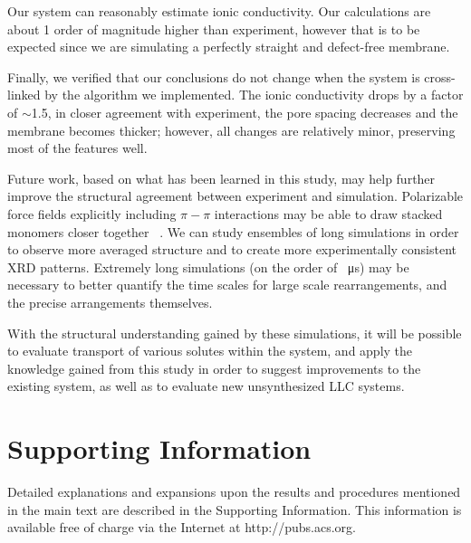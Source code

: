 \documentclass[journal=jpcbfk,manuscript=article]{achemso}
\begin{document}

  Our system can reasonably estimate ionic conductivity. Our
  calculations are about 1 order of magnitude higher than experiment, however
  that is to be expected since we are simulating a perfectly straight and
  defect-free membrane. 

  Finally, we verified that our conclusions do not change when the system is
  cross-linked by the algorithm we implemented. The ionic conductivity drops by a factor
  of $\sim$1.5, in closer agreement with experiment, the pore spacing decreases and
  the membrane becomes thicker; however, all changes are relatively minor, 
  preserving most of the features well.

  Future work, based on what has been learned in this study, may help further
  improve the structural agreement between experiment and simulation. 
  Polarizable force fields explicitly including $\pi-\pi$ interactions may be
  able to draw stacked monomers closer together 
  ~\cite{shi_polarizable_2013,kaminski_development_2004,lopes_polarizable_2007}. 
  We can study ensembles of long simulations in order
  to observe more averaged structure and to create more experimentally consistent
  XRD patterns. Extremely long simulations (on the order of \SI{}{\micro s}) may
  be necessary to better quantify the time scales for large scale rearrangements,
  and the precise arrangements themselves.

  With the structural understanding gained by these simulations, it will be
  possible to evaluate transport of various solutes within the system, and apply the
  knowledge gained from this study in order to suggest improvements to the
  existing system, as well as to evaluate new unsynthesized LLC systems.

  \section*{Supporting Information}
  
  Detailed explanations and expansions upon the results and procedures mentioned in 
  the main text are described in the Supporting Information. This information is 
  available free of charge via the Internet at http://pubs.acs.org.
\end{document}
